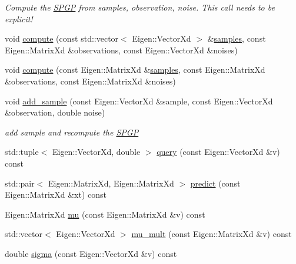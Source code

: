 \begin{DoxyCompactItemize}
\begin{DoxyCompactList}\small\item\em Compute the \hyperlink{classlimbo_1_1model_1_1_s_p_g_p}{S\+P\+G\+P} from samples, observation, noise. This call needs to be explicit! \end{DoxyCompactList}\item 
void \hyperlink{classlimbo_1_1model_1_1_s_p_g_p_af6f266cb123980286d8c2a445cf61825}{compute} (const std\+::vector$<$ Eigen\+::\+Vector\+Xd $>$ \&\hyperlink{classlimbo_1_1model_1_1_s_p_g_p_a867505eb41e8fe971eb7de28b2cea50f}{samples}, const Eigen\+::\+Matrix\+Xd \&observations, const Eigen\+::\+Vector\+Xd \&noises)
\item 
void \hyperlink{classlimbo_1_1model_1_1_s_p_g_p_a2729a11aedaa9373908e009387e7ca96}{compute} (const Eigen\+::\+Matrix\+Xd \&\hyperlink{classlimbo_1_1model_1_1_s_p_g_p_a867505eb41e8fe971eb7de28b2cea50f}{samples}, const Eigen\+::\+Matrix\+Xd \&observations, const Eigen\+::\+Matrix\+Xd \&noises)
\item 
void \hyperlink{classlimbo_1_1model_1_1_s_p_g_p_a2d12288884fadcd922c56718f70801a9}{add\+\_\+sample} (const Eigen\+::\+Vector\+Xd \&sample, const Eigen\+::\+Vector\+Xd \&observation, double noise)
\begin{DoxyCompactList}\small\item\em add sample and recompute the \hyperlink{classlimbo_1_1model_1_1_s_p_g_p}{S\+P\+G\+P} \end{DoxyCompactList}\item 
std\+::tuple$<$ Eigen\+::\+Vector\+Xd, double $>$ \hyperlink{classlimbo_1_1model_1_1_s_p_g_p_a42182a521e79e95b7e9cc4f1cd256650}{query} (const Eigen\+::\+Vector\+Xd \&v) const 
\item 
std\+::pair$<$ Eigen\+::\+Matrix\+Xd, Eigen\+::\+Matrix\+Xd $>$ \hyperlink{classlimbo_1_1model_1_1_s_p_g_p_ad699ef0c60c08ad24513d16d6c4f0c26}{predict} (const Eigen\+::\+Matrix\+Xd \&xt) const 
\item 
Eigen\+::\+Matrix\+Xd \hyperlink{classlimbo_1_1model_1_1_s_p_g_p_a93dc0f879b84a302382edf103fa00da9}{mu} (const Eigen\+::\+Matrix\+Xd \&v) const 
\item 
std\+::vector$<$ Eigen\+::\+Vector\+Xd $>$ \hyperlink{classlimbo_1_1model_1_1_s_p_g_p_ab7cd17b138cae0693ebec8101b401ee0}{mu\+\_\+mult} (const Eigen\+::\+Matrix\+Xd \&v) const 
\item 
double \hyperlink{classlimbo_1_1model_1_1_s_p_g_p_a69e98f453f5bcb2cf2c76469f91fab24}{sigma} (const Eigen\+::\+Vector\+Xd \&v) const 
\item 

\end{DoxyCompactItemize}
